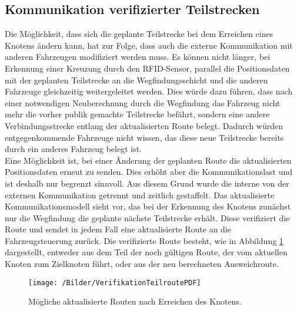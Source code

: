 	\subsection{Kommunikation verifizierter Teilstrecken}
		\label{Anpassung Kommunikation}
		Die Möglichkeit, dass sich die geplante Teilstrecke bei dem Erreichen eines Knotens ändern kann, hat zur Folge, dass auch die externe Kommunikation mit anderen Fahrzeugen modifiziert werden muss. Es können nicht länger, bei Erkennung einer Kreuzung durch den \ac{RFID}-Sensor, parallel die Positionsdaten mit der geplanten Teilstrecke an die Wegfindungsschicht und die anderen Fahrzeuge gleichzeitig weitergeleitet werden. Dies würde dazu führen, dass nach einer notwendigen Neuberechnung durch die Wegfindung das Fahrzeug nicht mehr die vorher publik gemachte Teilstrecke befährt, sondern eine andere Verbindungsstrecke entlang der aktualisierten Route belegt. Dadurch würden entgegenkommende Fahrzeuge nicht wissen, das diese neue Teilstrecke bereits durch ein anderes Fahrzeug belegt ist.
		\\[4pt]
		Eine Möglichkeit ist, bei einer Änderung der geplanten Route die aktualisierten Positionsdaten erneut zu senden. Dies erhöht aber die Kommunikationslast und ist deshalb nur begrenzt sinnvoll. Aus diesem Grund  wurde die interne von der externen Kommunikation getrennt und zeitlich gestaffelt. Das aktualisierte Kommunikationsmodell sieht vor, das bei der Erkennung des Knotens zunächst nur die Wegfindung die geplante nächste Teilstrecke erhält. Diese verifiziert die Route und sendet in jedem Fall eine aktualisierte Route an die Fahrzeugsteuerung zurück. Die verifizierte Route besteht, wie in Abbildung \ref{MoeglicheTeilrouten} dargestellt, entweder aus dem Teil der noch gültigen Route, der vom aktuellen Knoten zum Zielknoten führt, oder aus der neu berechneten Ausweichroute.
		
		\begin{figure}[h]
			\centering
			\texttt{[image: /Bilder/VerifikationTeilroutePDF]}
			\vspace{0.2cm}
			\caption{Mögliche aktualisierte Routen nach Erreichen des Knotens.}\label{MoeglicheTeilrouten}
		\end{figure}
		
